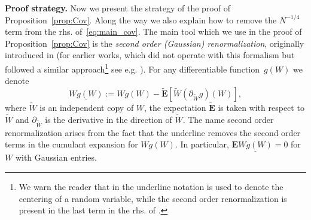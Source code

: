 \documentclass[10pt]{amsart}
\numberwithin{equation}{section}
\newcommand{\E}{\mathbf{E}}
\begin{document}
\smallskip

\textbf{Proof strategy.} Now we present the strategy of the proof of Proposition~\ref{prop:Cov}. Along the way we also explain how to remove the $N^{-1/4}$ term from the rhs. of~\eqref{eq:main_cov}. The main tool which we use in the proof of Proposition~\ref{prop:Cov} is the \emph{second order (Gaussian) renormalization}, originally introduced in \cite[Eq.(4.2)]{ETH_Wigner} (for earlier works, which did not operate with this formalism but followed a similar approach\footnote{We warn the reader that in \cite{Knowles20} the underline notation is used to denote the centering of a random variable, while the second order renormalization is present in the last term in the rhs. of \cite[Eq.(2.5)]{Knowles20}.} see e.g. \cite[Eq.(2.5)]{Knowles20}). For any differentiable function~$g(W)$ we denote
\begin{equation}
\underline{Wg(W)}:=Wg(W) - \widetilde{\E}\left[ \widetilde{W}\left(\partial_{\widetilde{W}}g\right)(W)\right],
\label{eq:def_under_1}
\end{equation} 
where $\widetilde{W}$ is an independent copy of $W$, the expectation $\widetilde{\E}$ is taken with respect to $\widetilde{W}$ and $\partial_{\widetilde{W}}$ is the derivative in the direction of $\widetilde{W}$. The name second order renormalization arises from the fact that the underline removes the second order terms in the cumulant expansion for $Wg(W)$. In particular, $\E\underline{Wg(W)}=0$ for $W$ with Gaussian entries.
\end{document}
